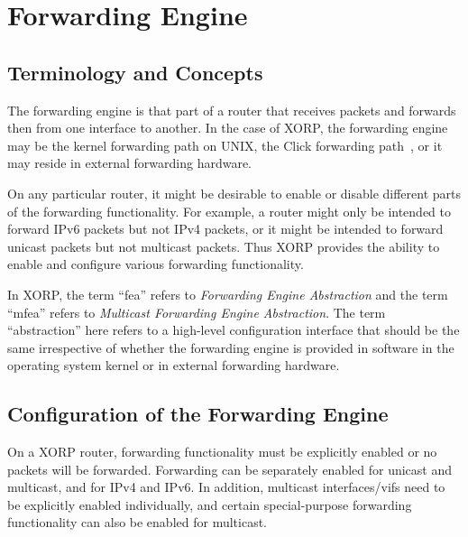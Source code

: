 %
%

\chapter{Forwarding Engine}

\section{Terminology and Concepts}

The forwarding engine is that part of a router that receives packets
and forwards then from one interface to another.  In the case of XORP,
the forwarding engine may be the kernel forwarding path on UNIX,
the Click forwarding path~\cite{CLICK-PROJECT}, or it may reside in
external forwarding hardware.

On any particular router, it might be desirable to enable or disable
different parts of the forwarding functionality.  For example, a
router might only be intended to forward IPv6 packets but not IPv4
packets, or it might be intended to forward unicast packets but not
multicast packets.  Thus XORP provides the ability to enable and
configure various forwarding functionality.

In XORP, the term ``{\stt fea}'' refers to {\it Forwarding Engine
Abstraction} and the term ``{\stt mfea}'' refers to {\it Multicast
Forwarding Engine Abstraction}.  The term ``abstraction'' here refers to
a high-level configuration interface that should be the same
irrespective of whether the forwarding engine is provided in software
in the operating system kernel or in external forwarding hardware.

\newpage
\section{Configuration of the Forwarding Engine}

On a XORP router, forwarding functionality must be explicitly enabled
or no packets will be forwarded.  Forwarding can be separately enabled
for unicast and multicast, and for IPv4 and IPv6.  In addition,
multicast interfaces/vifs need to be explicitly enabled individually,
and certain special-purpose forwarding functionality can also be
enabled for multicast.

